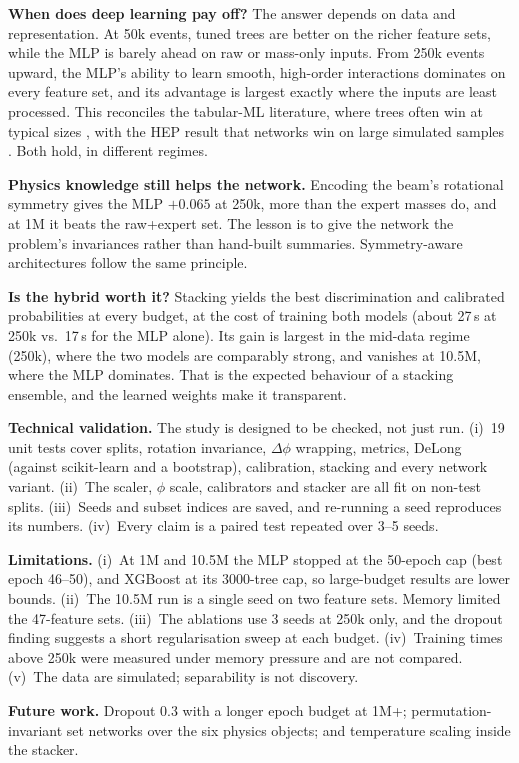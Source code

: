 \textbf{When does deep learning pay off?} The answer depends on data and representation. At 50k
events, tuned trees are better on the richer feature sets, while the MLP is barely ahead on raw or
mass-only inputs. From 250k events upward, the MLP's ability to learn smooth, high-order interactions
dominates on every feature set, and its advantage is largest exactly where the inputs are least
processed. This reconciles the tabular-ML literature, where trees often win at typical sizes
\cite{grinsztajn2022tree,shwartzziv2022tabular}, with the HEP result that networks win on large
simulated samples \cite{baldi2014searching}. Both hold, in different regimes.

\textbf{Physics knowledge still helps the network.} Encoding the beam's rotational symmetry gives
the MLP $+0.065$ at 250k, more than the expert masses do, and at 1M it beats the raw+expert set. The
lesson is to give the network the problem's invariances rather than hand-built summaries.
Symmetry-aware architectures \cite{komiske2019energyflow} follow the same principle.

\textbf{Is the hybrid worth it?} Stacking yields the best discrimination and calibrated
probabilities at every budget, at the cost of training both models (about 27\,s at 250k vs.\ 17\,s
for the MLP alone). Its gain is largest in the mid-data regime (250k), where the two models are
comparably strong, and vanishes at 10.5M, where the MLP dominates. That is the expected behaviour of
a stacking ensemble, and the learned weights make it transparent.

\textbf{Technical validation.} The study is designed to be checked, not just run.
(i)~19 unit tests cover splits, rotation invariance, $\Delta\phi$ wrapping, metrics, DeLong
(against scikit-learn and a bootstrap), calibration, stacking and every network variant.
(ii)~The scaler, $\phi$ scale, calibrators and stacker are all fit on non-test splits.
(iii)~Seeds and subset indices are saved, and re-running a seed reproduces its numbers.
(iv)~Every claim is a paired test repeated over 3--5 seeds.

\textbf{Limitations.}
(i)~At 1M and 10.5M the MLP stopped at the 50-epoch cap (best epoch 46--50), and XGBoost at its
3000-tree cap, so large-budget results are lower bounds.
(ii)~The 10.5M run is a single seed on two feature sets. Memory limited the 47-feature sets.
(iii)~The ablations use 3 seeds at 250k only, and the dropout finding suggests a short
regularisation sweep at each budget.
(iv)~Training times above 250k were measured under memory pressure and are not compared.
(v)~The data are simulated; separability is not discovery.

\textbf{Future work.} Dropout 0.3 with a longer epoch budget at 1M+; permutation-invariant
set networks over the six physics objects; and temperature scaling inside the stacker.
